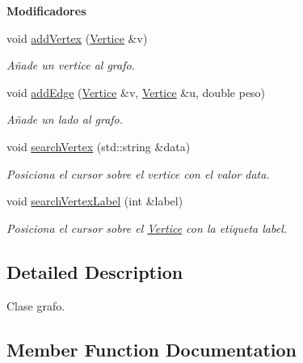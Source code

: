 \begin{Indent}{\bf Modificadores}\par
\begin{DoxyCompactItemize}
\item 
void \hyperlink{classed_1_1Grafo_a1afde82a425b7606205d17d88809c4f4}{add\+Vertex} (\hyperlink{classed_1_1Vertice}{Vertice} \&v)
\begin{DoxyCompactList}\small\item\em Añade un vertice al grafo. \end{DoxyCompactList}\item 
void \hyperlink{classed_1_1Grafo_a2a9c0aa77bcd7202fb4755f505504bfc}{add\+Edge} (\hyperlink{classed_1_1Vertice}{Vertice} \&v, \hyperlink{classed_1_1Vertice}{Vertice} \&u, double peso)
\begin{DoxyCompactList}\small\item\em Añade un lado al grafo. \end{DoxyCompactList}\item 
void \hyperlink{classed_1_1Grafo_ac238e5105d66c721f2d8a9a726ff9735}{search\+Vertex} (std\+::string \&data)
\begin{DoxyCompactList}\small\item\em Posiciona el cursor sobre el vertice con el valor data. \end{DoxyCompactList}\item 
void \hyperlink{classed_1_1Grafo_a48ef6791a21a78a8bf84bdb146bf5428}{search\+Vertex\+Label} (int \&label)
\begin{DoxyCompactList}\small\item\em Posiciona el cursor sobre el \hyperlink{classed_1_1Vertice}{Vertice} con la etiqueta label. \end{DoxyCompactList}\end{DoxyCompactItemize}
\end{Indent}


\subsection{Detailed Description}
Clase grafo. 

\subsection{Member Function Documentation}
